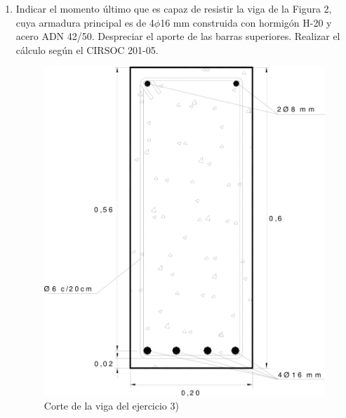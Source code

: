 \begin{enumerate}
\item Indicar el momento último que es capaz de resistir la viga de la Figura 2, cuya armadura principal es de 4$\phi$16 mm construida con hormigón H-20 y acero ADN 42/50. Despreciar el aporte de las barras superiores. Realizar el cálculo según el CIRSOC 201-05.
\begin{figure}[H]
\begin{center}
     \includegraphics[scale = 0.9]{chapters/chapter_1/images/figura2.png}
     \caption{Corte de la viga del ejercicio 3)}
\end{center}
\end{figure}
\end{enumerate}


